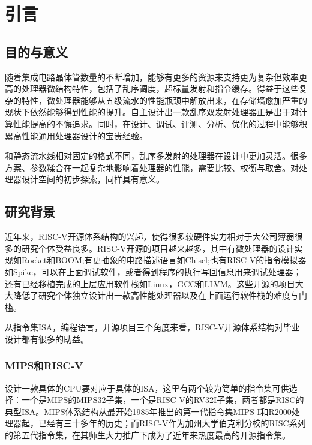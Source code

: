 \chapter{引言}\label{chap:introduction}

\section{目的与意义}

随着集成电路晶体管数量的不断增加，能够有更多的资源来支持更为复杂但效率更高的处理器微结构特性，包括了乱序调度，超标量发射和指令缓存。得益于这些复杂的特性，微处理器能够从五级流水的性能瓶颈中解放出来，在存储墙愈加严重的现状下依然能够得到性能的提升。自主设计出一款乱序双发射处理器正是出于对计算性能提高的不懈追求。同时，在设计、调试、评测、分析、优化的过程中能够积累高性能通用处理器设计的宝贵经验。

和静态流水线相对固定的格式不同，乱序多发射的处理器在设计中更加灵活。很多方案、参数糅合在一起复杂地影响着处理器的性能，需要比较、权衡与取舍。对处理器设计空间的初步探索，同样具有意义。

\section{研究背景}

近年来，RISC-V开源体系结构的兴起，使得很多软硬件实力相对于大公司薄弱很多的研究个体受益良多。RISC-V开源的项目越来越多，其中有微处理器的设计实现如Rocket和BOOM;有更抽象的电路描述语言如Chisel;也有RISC-V的指令模拟器如Spike，可以在上面调试软件，或者得到程序的执行写回信息用来调试处理器；还有已经移植完成的上层应用软件栈如Linux，GCC和LLVM。这些开源的项目大大降低了研究个体独立设计出一款高性能处理器以及在上面运行软件栈的难度与门槛。

从指令集ISA，编程语言，开源项目三个角度来看，RISC-V开源体系结构对毕业设计都有很多的助益。

\subsection{MIPS和RISC-V}\label{subsec:ISA}
设计一款具体的CPU要对应于具体的ISA，这里有两个较为简单的指令集可供选择：一个是MIPS的MIPS32子集，一个是RISC-V的RV32I子集，两者都是RISC的典型ISA。MIPS体系结构从最开始1985年推出的第一代指令集MIPS I和R2000处理器起，已经有三十多年的历史；而RISC-V作为加州大学伯克利分校的RISC系列的第五代指令集，在其师生大力推广下成为了近年来热度最高的开源指令集。

